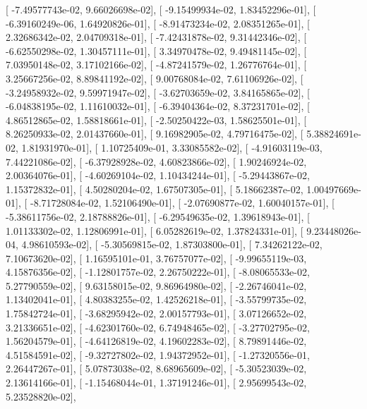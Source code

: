 \documentclass{article}
\begin{document}
       [ -7.49577743e-02,   9.66026698e-02],
       [ -9.15499934e-02,   1.83452296e-01],
       [ -6.39160249e-06,   1.64920826e-01],
       [ -8.91473234e-02,   2.08351265e-01],
       [  2.32686342e-02,   2.04709318e-01],
       [ -7.42431878e-02,   9.31442346e-02],
       [ -6.62550298e-02,   1.30457111e-01],
       [  3.34970478e-02,   9.49481145e-02],
       [  7.03950148e-02,   3.17102166e-02],
       [ -4.87241579e-02,   1.26776764e-01],
       [  3.25667256e-02,   8.89841192e-02],
       [  9.00768084e-02,   7.61106926e-02],
       [ -3.24958932e-02,   9.59971947e-02],
       [ -3.62703659e-02,   3.84165865e-02],
       [ -6.04838195e-02,   1.11610032e-01],
       [ -6.39404364e-02,   8.37231701e-02],
       [  4.86512865e-02,   1.58818661e-01],
       [ -2.50250422e-03,   1.58625501e-01],
       [  8.26250933e-02,   2.01437660e-01],
       [  9.16982905e-02,   4.79716475e-02],
       [  5.38824691e-02,   1.81931970e-01],
       [  1.10725409e-01,   3.33085582e-02],
       [ -4.91603119e-03,   7.44221086e-02],
       [ -6.37928928e-02,   4.60823866e-02],
       [  1.90246924e-02,   2.00364076e-01],
       [ -4.60269104e-02,   1.10434244e-01],
       [ -5.29443867e-02,   1.15372832e-01],
       [  4.50280204e-02,   1.67507305e-01],
       [  5.18662387e-02,   1.00497669e-01],
       [ -8.71728084e-02,   1.52106490e-01],
       [ -2.07690877e-02,   1.60040157e-01],
       [ -5.38611756e-02,   2.18788826e-01],
       [ -6.29549635e-02,   1.39618943e-01],
       [  1.01133302e-02,   1.12806991e-01],
       [  6.05282619e-02,   1.37824331e-01],
       [  9.23448026e-04,   4.98610593e-02],
       [ -5.30569815e-02,   1.87303800e-01],
       [  7.34262122e-02,   7.10673620e-02],
       [  1.16595101e-01,   3.76757077e-02],
       [ -9.99655119e-03,   4.15876356e-02],
       [ -1.12801757e-02,   2.26750222e-01],
       [ -8.08065533e-02,   5.27790559e-02],
       [  9.63158015e-02,   9.86964980e-02],
       [ -2.26746041e-02,   1.13402041e-01],
       [  4.80383255e-02,   1.42526218e-01],
       [ -3.55799735e-02,   1.75842724e-01],
       [ -3.68295942e-02,   2.00157793e-01],
       [  3.07126652e-02,   3.21336651e-02],
       [ -4.62301760e-02,   6.74948465e-02],
       [ -3.27702795e-02,   1.56204579e-01],
       [ -4.64126819e-02,   4.19602283e-02],
       [  8.79891446e-02,   4.51584591e-02],
       [ -9.32727802e-02,   1.94372952e-01],
       [ -1.27320556e-01,   2.26447267e-01],
       [  5.07873038e-02,   8.68965609e-02],
       [ -5.30523039e-02,   2.13614166e-01],
       [ -1.15468044e-01,   1.37191246e-01],
       [  2.95699543e-02,   5.23528820e-02],
\end{document}
